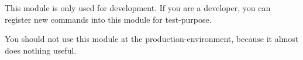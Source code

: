 
This module is only used for development.
If you are a developer, you can register new commands into this module for test-purpose.


\begin{warn}{}
    You should not use this module at the production-environment, because it almost does nothing useful.
\end{warn}

